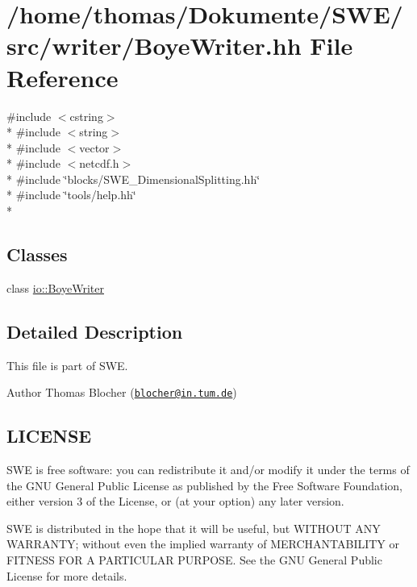 \hypertarget{BoyeWriter_8hh}{\section{/home/thomas/\-Dokumente/\-S\-W\-E/src/writer/\-Boye\-Writer.hh File Reference}
\label{BoyeWriter_8hh}
}
{\ttfamily \#include $<$cstring$>$}\\*
{\ttfamily \#include $<$string$>$}\\*
{\ttfamily \#include $<$vector$>$}\\*
{\ttfamily \#include $<$netcdf.\-h$>$}\\*
{\ttfamily \#include \char`\"{}blocks/\-S\-W\-E\-\_\-\-Dimensional\-Splitting.\-hh\char`\"{}}\\*
{\ttfamily \#include \char`\"{}tools/help.\-hh\char`\"{}}\\*
\subsection*{Classes}
\begin{DoxyCompactItemize}
\item 
class \hyperlink{classio_1_1BoyeWriter}{io\-::\-Boye\-Writer}
\end{DoxyCompactItemize}


\subsection{Detailed Description}
This file is part of S\-W\-E.

\begin{DoxyAuthor}{Author}
Thomas Blocher (\href{mailto:blocher@in.tum.de}{\tt blocher@in.\-tum.\-de})
\end{DoxyAuthor}
\hypertarget{Writer_8hh_LICENSE}{}\subsection{L\-I\-C\-E\-N\-S\-E}\label{Writer_8hh_LICENSE}
S\-W\-E is free software\-: you can redistribute it and/or modify it under the terms of the G\-N\-U General Public License as published by the Free Software Foundation, either version 3 of the License, or (at your option) any later version.

S\-W\-E is distributed in the hope that it will be useful, but W\-I\-T\-H\-O\-U\-T A\-N\-Y W\-A\-R\-R\-A\-N\-T\-Y; without even the implied warranty of M\-E\-R\-C\-H\-A\-N\-T\-A\-B\-I\-L\-I\-T\-Y or F\-I\-T\-N\-E\-S\-S F\-O\-R A P\-A\-R\-T\-I\-C\-U\-L\-A\-R P\-U\-R\-P\-O\-S\-E. See the G\-N\-U General Public License for more details.

